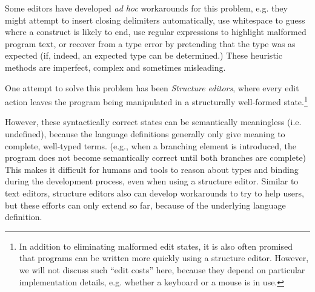 Some editors have developed \emph{ad hoc} workarounds for this problem, e.g. they might attempt to insert closing delimiters automatically, use whitespace to guess where a construct is likely to end, use regular expressions to highlight malformed program text, or recover from a type error by pretending that the type was as expected (if, indeed, an expected type can be determined.) These heuristic methods are imperfect, complex and sometimes misleading. %


One attempt to solve this problem has been \emph{Structure editors},
where every edit action leaves the program being manipulated in a 
structurally well-formed state.\footnote{In addition to eliminating malformed edit states, it is also often promised that programs can be written more quickly using a structure editor. However, we will not discuss such ``edit costs'' here, because they depend on particular implementation details, e.g. whether a keyboard or a mouse is in use.} 

However, these syntactically correct states can be semantically meaningless (i.e. undefined), because the language definitions generally only give meaning to complete, well-typed terms. (e.g., when a branching element is introduced, the program does not become semantically correct until both branches are complete)
This makes it difficult for humans and tools to reason about types and binding during the development process, even when using a structure editor.
Similar to text editors, structure editors also can develop workarounds to try to help users, but these efforts can only extend so far, because of the underlying language definition.

